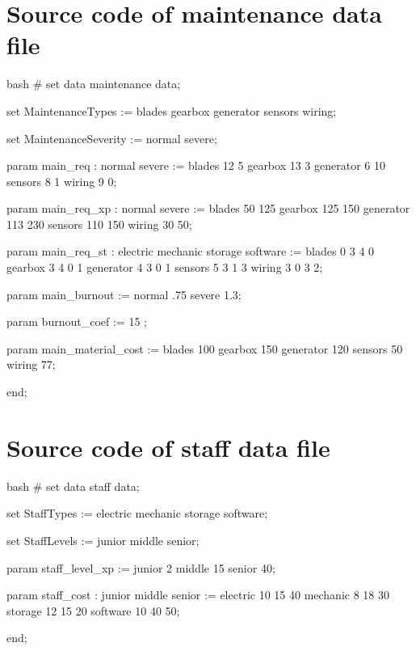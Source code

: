     \newline

\section{Source code of maintenance data file}
    \vspace{2pt}
    \begin{boxminted}{bash}
        # set data maintenance
        data;

        set MaintenanceTypes :=
            blades
            gearbox
            generator
            sensors
            wiring;
        
        set MaintenanceSeverity :=
            normal
            severe;
        
        param main_req :
                    normal		severe :=
            blades 12 5
            gearbox 13 3
            generator 6 10
            sensors 8 1
            wiring 9 0;
        
        param main_req_xp :
                    normal severe :=
            blades 50 125
            gearbox 125 150
            generator 113 230
            sensors 110 150
            wiring 30 50;
        
        param main_req_st :
                    electric mechanic storage software :=
            blades 0 3 4 0
            gearbox 3 4 0 1
            generator 4 3 0 1
            sensors 5 3 1 3
            wiring 3 0 3 2;
        
        param main_burnout :=
            normal .75
            severe 1.3;
        
        param burnout_coef := 15 ;
        
        param main_material_cost :=
            blades 100
            gearbox 150
            generator 120
            sensors 50
            wiring 77;

        end;         
    \end{boxminted}
    \newline

\section{Source code of staff data file}
    \vspace{2pt}
    \begin{boxminted}{bash}
        # set data staff
        data;
        
        set StaffTypes :=
            electric
            mechanic
            storage
            software;
        
        set StaffLevels :=
            junior
            middle
            senior;
        
        param staff_level_xp :=
            junior 2
            middle 15
            senior 40;
        
        param staff_cost :
                    junior middle senior :=
            electric 10 15 40
            mechanic 8 18 30
            storage 12 15 20
            software 10 40 50;
        
        end;     
    \end{boxminted}
    \newline
